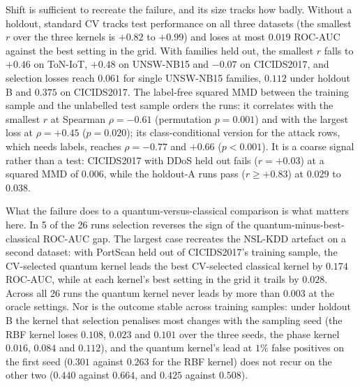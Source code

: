 \documentclass[preprint,11pt]{elsarticle}
\begin{document}
Shift is sufficient to recreate the failure, and its size tracks how badly. Without a holdout, standard
CV tracks test performance on all three datasets (the smallest $r$ over the three kernels is $+0.82$ to
$+0.99$) and loses at most $0.019$ ROC-AUC against the best setting in the grid. With families held out,
the smallest $r$ falls to $+0.46$ on ToN-IoT, $+0.48$ on UNSW-NB15 and $-0.07$ on CICIDS2017, and
selection losses reach $0.061$ for single UNSW-NB15 families, $0.112$ under holdout B and $0.375$ on
CICIDS2017. The label-free squared MMD between the training sample and the unlabelled test sample orders
the runs: it correlates with the smallest $r$ at Spearman $\rho=-0.61$ (permutation $p=0.001$) and with
the largest loss at $\rho=+0.45$ ($p=0.020$); its class-conditional version for the attack rows, which
needs labels, reaches $\rho=-0.77$ and $+0.66$ ($p<0.001$). It is a coarse signal rather than a test:
CICIDS2017 with DDoS held out fails ($r=+0.03$) at a squared MMD of $0.006$, while the holdout-A runs pass
($r\ge+0.83$) at $0.029$ to $0.038$.

What the failure does to a quantum-versus-classical comparison is what matters here. In 5 of the 26 runs
selection reverses the sign of the quantum-minus-best-classical ROC-AUC gap. The largest case recreates
the NSL-KDD artefact on a second dataset: with PortScan held out of CICIDS2017's training sample, the
CV-selected quantum kernel leads the best CV-selected classical kernel by $0.174$ ROC-AUC, while at each
kernel's best setting in the grid it trails by $0.028$. Across all 26 runs the quantum kernel never leads
by more than $0.003$ at the oracle settings. Nor is the outcome stable across training samples: under
holdout B the kernel that selection penalises most changes with the sampling seed (the RBF kernel loses
$0.108$, $0.023$ and $0.101$ over the three seeds, the phase kernel $0.016$, $0.084$ and $0.112$), and
the quantum kernel's lead at $1\%$ false positives on the first seed ($0.301$ against $0.263$ for the RBF
kernel) does not recur on the other two ($0.440$ against $0.664$, and $0.425$ against $0.508$).
\end{document}
